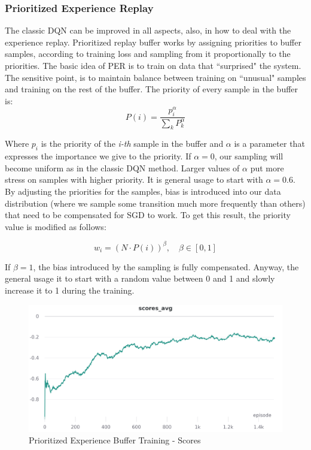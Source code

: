\documentclass[12pt]{article}
\begin{document}
\subsubsection{Prioritized Experience Replay}
The classic DQN can be improved in all aspects, also, in how to deal with the experience replay.
Prioritized replay buffer \cite{per} works by assigning priorities to buffer samples, according to training loss and sampling from it proportionally to the priorities. The basic idea of PER is to train on data that ``surprised" the system. The sensitive point, is to maintain balance between training on ``unusual" samples and training on the rest of the buffer.
The priority of every sample in the buffer is:
\[ P(i)= \frac{p^\alpha _i}{\sum_k P^\alpha _k} \]

Where $p_i$ is the priority of the \textit{i-th} sample in the buffer and $\alpha$ is a parameter that expresses the importance we give to the priority. If $\alpha=0$, our sampling will become uniform as in the classic DQN method. Larger values of $\alpha$ put more stress on samples with higher priority. It is general usage to start with $\alpha=0.6$.  
By adjusting the priorities for the samples, bias is introduced into our data distribution (where we sample some transition much more frequently than others) that need to be compensated for SGD to work. To get this result, the priority value is modified as follows:

\[w_i=(N \cdot  P(i))^\beta ,\quad \beta \in [0,1]\]

If $\beta = 1$, the bias introduced by the sampling is fully compensated. Anyway, the general usage it to start with a random value between 0 and 1 and slowly increase it to 1 during the training.


\begin{figure}[H]
        \centerline{\includegraphics[scale=.2]{res/charts/per_scores.png}}
        \caption{Prioritized Experience Buffer Training - Scores}
\end{figure}
\end{document}
